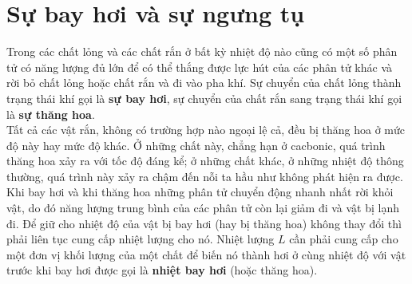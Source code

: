 \section{Sự bay hơi và sự ngưng tụ}\label{sec:15_2}

Trong các chất lỏng và các chất rắn ở bất kỳ nhiệt độ nào cũng có một số phân tử có năng lượng đủ lớn để có thể thắng được lực hút của các phân tử khác và rời bỏ chất lỏng hoặc chất rắn và đi vào pha khí. Sự chuyển của chất lỏng thành trạng thái khí gọi là \textbf{sự bay hơi}, sự chuyển của chất rắn sang trạng thái khí gọi là \textbf{sự thăng hoa}.\\

Tất cả các vật rắn, không có trường hợp nào ngoại lệ cả, đều bị thăng hoa ở mức độ này hay mức độ khác. Ở những chất này, chẳng hạn ở cacbonic, quá trình thăng hoa xảy ra với tốc độ đáng kể; ở những chất khác, ở những nhiệt độ thông thường, quá trình này xảy ra chậm đến nỗi ta hầu như không phát hiện ra được.\\

Khi bay hơi và khi thăng hoa những phân tử chuyển động nhanh nhất rời khỏi vật, do đó năng lượng trung bình của các phân tử còn lại giảm đi và vật bị lạnh đi. Để giữ cho nhiệt độ của vật bị bay hơi (hay bị thăng hoa) không thay đổi thì phải liên tục cung cấp nhiệt lượng cho nó. Nhiệt lượng $L$ cần phải cung cấp cho một đơn vị khối lượng của một chất để biến nó thành hơi ở cùng nhiệt độ với vật trước khi bay hơi được gọi là \textbf{nhiệt bay hơi} (hoặc thăng hoa).\\

